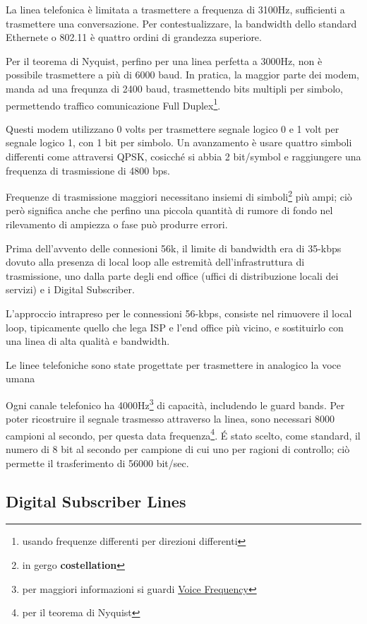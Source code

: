 \documentclass[../ComputerNetworks.tex]{subfiles}
\begin{document}
La linea telefonica è limitata a trasmettere a frequenza di 3100Hz, sufficienti a trasmettere una conversazione.
Per contestualizzare, la bandwidth dello standard Ethernete o 802.11 è quattro ordini di grandezza superiore.

Per il teorema di Nyquist, perfino per una linea perfetta a 3000Hz, non è possibile trasmettere a più di 6000 baud.
In pratica, la maggior parte dei modem, manda ad una frequnza di 2400 baud, trasmettendo bits multipli per simbolo, permettendo traffico comunicazione Full Duplex\footnote{usando frequenze differenti per direzioni differenti}.

Questi modem utilizzano 0 volts per trasmettere segnale logico 0 e 1 volt per segnale logico 1, con 1 bit per simbolo.
Un avanzamento è usare quattro simboli differenti come attraversi QPSK, cosicché si abbia 2 bit/symbol e raggiungere una frequenza di trasmissione di 4800 bps.

Frequenze di trasmissione maggiori necessitano insiemi di simboli\footnote{in gergo \textbf{costellation}} più ampi; ciò però significa anche che perfino una piccola quantità di rumore di fondo nel rilevamento di ampiezza o fase può produrre errori.

Prima dell'avvento delle connesioni 56k, il limite di bandwidth era di 35-kbps dovuto alla presenza di local loop alle estremità dell'infrastruttura di trasmissione, uno dalla parte degli end office (uffici di distribuzione locali dei servizi) e i Digital Subscriber.

L'approccio intrapreso per le connessioni 56-kbps, consiste nel rimuovere il local loop, tipicamente quello che lega ISP e l'end office più vicino, e sostituirlo con una linea di alta qualità e bandwidth.

Le linee telefoniche sono state progettate per trasmettere in analogico la voce umana

Ogni canale telefonico ha 4000Hz\footnote{per maggiori informazioni si guardi \href{https://en.wikipedia.org/wiki/Voice_frequency}{Voice Frequency}} di capacità, includendo le guard bands.
Per poter ricostruire il segnale trasmesso attraverso la linea, sono necessari 8000 campioni al secondo, per questa data frequenza\footnote{per il teorema di Nyquist}.
\'E stato scelto, come standard,  il numero di 8 bit al secondo per campione di cui uno per ragioni di controllo; ciò permette il trasferimento di 56000 bit/sec.

\subsection{Digital Subscriber Lines}
\end{document}

